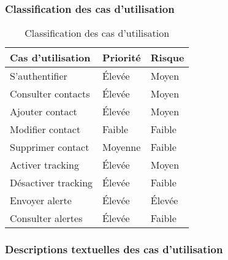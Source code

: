 \subsubsection{Classification des cas d’utilisation}
\begin{table}[H]
	\large
	\captionsetup{justification=raggedright, singlelinecheck=false, font=large,font+=it}
	\caption{Classification des cas d’utilisation}
	\begin{tabularx}{\textwidth}{@{}XXX@{}}
		\hline
		\hline
		\textbf{Cas d’utilisation} & \textbf{Priorité} & \textbf{Risque}\\
		\hline\hline
		S’authentifier & Élevée & Moyen\\
		Consulter contacts & Élevée & Moyen\\
		Ajouter contact & Élevée & Moyen\\
		Modifier contact & Faible & Faible\\
		Supprimer contact & Moyenne & Faible\\
		Activer tracking & Élevée & Moyen\\
		Désactiver tracking & Élevée & Faible\\
		Envoyer alerte & Élevée & Élevée\\
		Consulter alertes & Élevée & Faible\\
		\hline
	\end{tabularx}
\end{table}
\subsubsection{Descriptions textuelles des cas d’utilisation}


